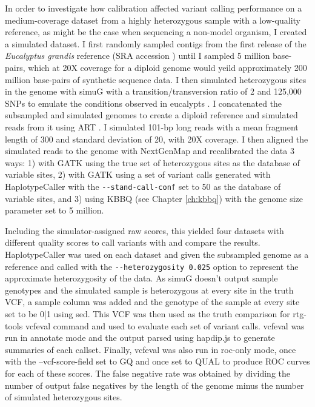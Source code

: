 %
In order to investigate how calibration affected variant calling performance on a medium-coverage dataset from a highly heterozygous sample with a low-quality reference, as might be the case when sequencing a non-model organism, I created a simulated dataset. I first randomly sampled contigs from the first release of the \textit{Eucalyptus grandis} reference (SRA accession ) until I sampled 5 million base-pairs, which at 20X coverage for a diploid genome would yeild approximately 200 million base-pairs of synthetic sequence data. I then simulated heterozygous sites in the genome with simuG \parencite{yue_simug_2019} with a transition/transversion ratio of 2 and 125,000 SNPs to emulate the conditions observed in eucalypts \parencite{kulheim_comparative_2009}. I concatenated the subsampled and simulated genomes to create a diploid reference and simulated reads from it using ART \parencite{huang_art_2012}. I simulated 101-bp long reads with a mean fragment length of 300 and standard deviation of 20, with 20X coverage. I then aligned the simulated reads to the genome with NextGenMap \parencite{sedlazeck_nextgenmap_2013} and recalibrated the data 3 ways: 1) with GATK using the true set of heterozygous sites as the database of variable sites, 2) with GATK using a set of variant calls generated with HaplotypeCaller with the \texttt{-\phantom{}-stand-call-conf} set to 50 as the database of variable sites, and 3) using KBBQ (see Chapter \ref{ch:kbbq}) with the genome size parameter set to 5 million.

Including the simulator-assigned raw scores, this yielded four datasets with different quality scores to call variants with and compare the results. HaplotypeCaller was used on each dataset and given the subsampled genome as a reference and called with the \texttt{-\phantom{}-heterozygosity 0.025} option to represent the approximate heterozygosity of the data. As simuG doesn't output sample genotypes and the simulated sample is heterozygous at every site in the truth VCF, a sample column was added and the genotype of the sample at every site set to be 0|1 using sed. This VCF was then used as the truth comparison for rtg-tools vcfeval command and used to evaluate each set of variant calls. vcfeval was run in annotate mode and the output parsed using hapdip.js to generate summaries of each callset. Finally, vcfeval was also run in roc-only mode, once with the --vcf-score-field set to GQ and once set to QUAL to produce ROC curves for each of these scores. The false negative rate was obtained by dividing the number of output false negatives by the length of the genome minus the number of simulated heterozygous sites.

